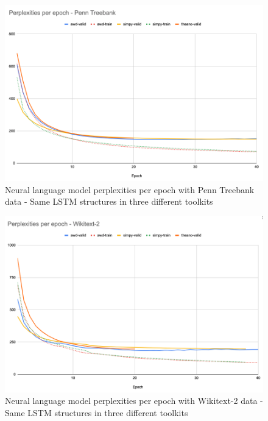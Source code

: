 \begin{figure}[!htbp]
    \centering
    \includegraphics[width=\textwidth,height=\textheight,keepaspectratio]{ppl_ptb}
    \caption{Neural language model perplexities per epoch with Penn Treebank data - Same LSTM structures in three different toolkits}
    \label{fig:ppl_ptb}
\end{figure}


\begin{figure}[!htbp]
    \centering
    \includegraphics[width=\textwidth,height=\textheight,keepaspectratio]{ppl_wiki}
    \caption{Neural language model perplexities per epoch with Wikitext-2 data - Same LSTM structures in three different toolkits}
    \label{fig:ppl_wiki}
\end{figure}

